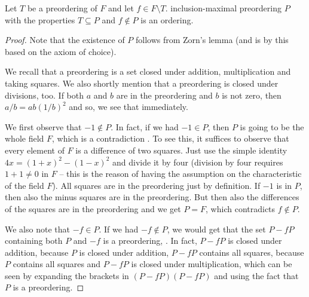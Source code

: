 \begin{lemma}[Serre 1947]
	\label{lem:Serre}
	Let $T$ be a preordering of $F$ and let $f \in F \setminus T$.
	 inclusion-maximal preordering $P$ with the properties $T \subseteq P$ and $f \not\in P$ is an ordering. 
\end{lemma}

\begin{proof}
	Note that the existence of $P$ follows from Zorn's lemma (and is by this based on the axiom of choice).
	
	We recall that a preordering is a set closed under addition, multiplication and taking squares. We also shortly mention that a preordering is closed under divisions, too. If both $a$ and $b$ are in the preordering and $b$ is not zero, then $a/b = a b (1/b)^2$ and so, we see that immediately.
	
	We first observe that $-1 \not\in P$. In fact, if we had $-1 \in P$, then $P$ is going to be the whole field $F$, which is a contradiction . To see this, it suffices to observe that every element of $F$ is a difference of two squares. Just use the simple identity $ 4 x = (1+x)^2 - (1-x)^2$ and divide it by four (division by four requires $1+1 \ne 0$ in $F$ -- this is the reason of having the assumption on the characteristic of the field $F$). All squares are in the preordering just by definition. If $-1$ is in $P$, then also the minus squares are in the preordering. But then also the differences of the squares are in the preordering and we get $P=F$, which contradicts $f \not\in P$. 
	
	
	We also note that $-f \in P$. If we had $-f \not \in P$, we would get that the set $P - f P$ containing both $P$ and $-f$ is a preordering, . In fact, $P - f P$ is closed under addition, because $P$ is closed under addition, $P-f P$ contains all squares, because $P$ contains all squares and $P- f P$ is closed under multiplication, which can be seen by expanding the brackets in $(P -f P)(P - fP)$ and using the fact that $P$ is a preordering. 
	

\end{proof}
